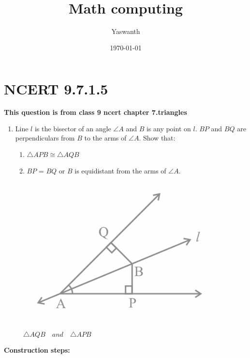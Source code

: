 \documentclass[11pt, a4paper]{article}
\title{ Math computing}
\author{ Yaswanth }
\date{\today}
\begin{document}
\vspace{-\baselineskip}
\maketitle

\section*{NCERT 9.7.1.5}

\textbf{This question is from class 9 ncert chapter 7.triangles}
\begin{enumerate}
    \item Line $l$ is the bisector of an angle $\angle A$ and $B$ is any point on $l$. $BP$ and $BQ$ are perpendiculars from $B$ to the arms of $\angle A$. Show that:
%
\begin{enumerate}
    \item $\triangle  APB \cong \triangle AQB$  
    \item $BP$ = $BQ$ or $B$ is equidistant from the arms of $\angle A$.
 \end{enumerate}
\end{enumerate}
\begin{figure}[H]
    \centering
    \includegraphics[width=1\columnwidth]{fig_mc.png}
    \caption{$\triangle AQB \hspace{12pt} and \hspace{12pt} \triangle APB$}
    \label{fig:math_comp1}
\end{figure}
\pagebreak
\textbf{Construction steps:}
%
\end{document}

